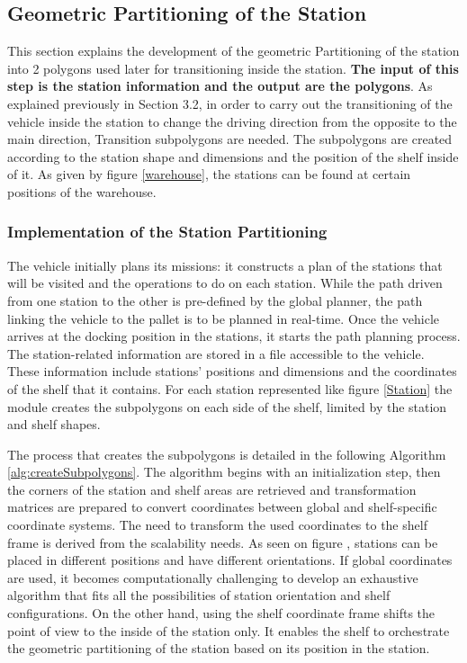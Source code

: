 \subsection{Geometric Partitioning of the Station}
This section explains the development of the geometric Partitioning of the station into 2 polygons used later for 
transitioning inside the station. \textbf{The input of this step is the station information and the output are the polygons}.
As explained previously in Section 3.2, in order to carry out the transitioning of the vehicle inside 
the station to change the driving direction from the opposite to the main direction, Transition subpolygons are needed. 
The subpolygons are created according to the station shape and dimensions and the position of the shelf inside of it. 
As given by figure \ref{warehouse}, the stations can be found at certain positions of the warehouse.

\subsubsection{Implementation of the Station Partitioning}
The vehicle initially plans its missions: it constructs a plan of the stations that will be visited and the operations
to do on each station. While the path driven from one station to the other is pre-defined by the global planner, 
the path linking the vehicle to the pallet is to be planned in real-time. 
Once the vehicle arrives at the docking position in the stations, it starts the path planning process. 
The station-related information are stored in a file accessible to the vehicle. These information include stations' 
positions and dimensions and the coordinates of the shelf that it contains.
For each station represented like figure \ref{Station} the module creates the subpolygons on each side of the shelf, 
limited by the station and shelf shapes. 

The process that creates the subpolygons is detailed in the following Algorithm \ref{alg:createSubpolygons}.
The algorithm begins with an initialization step, then the corners of the station and shelf areas are retrieved and 
transformation matrices are prepared to convert coordinates between global and shelf-specific coordinate systems. 
The need to transform the used coordinates to the shelf frame is derived from the scalability needs.
As seen on figure , stations can be placed in different positions and have different orientations.
If global coordinates are used, it becomes computationally challenging to develop an exhaustive algorithm that fits all the 
possibilities of station orientation and shelf configurations. On the other hand, using the shelf coordinate frame shifts 
the point of view to the inside of the station only. It enables the shelf to orchestrate the geometric partitioning 
of the station based on its position in the station.

